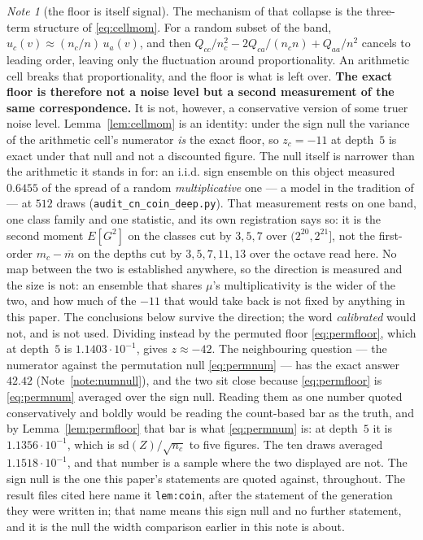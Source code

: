 \documentclass[11pt,a4paper]{article}
\theoremstyle{plain}
\theoremstyle{definition}
\theoremstyle{remark}
\newtheorem{note}[theorem]{Note}
\begin{document}
\begin{note}[the floor is itself signal]\label{note:floorsignal}
The mechanism of that collapse is the three-term structure of
\eqref{eq:cellmom}. For a random subset of the band,
$u_c(v)\approx(n_c/n)\,u_a(v)$, and then
$Q_{cc}/n_c^2-2Q_{ca}/(n_cn)+Q_{aa}/n^2$ cancels to leading order,
leaving only the fluctuation around proportionality. An arithmetic
cell breaks that proportionality, and the floor is what is left over.
\textbf{The exact floor is therefore not a noise level but a second
measurement of the same correspondence.} It is not, however, a
conservative version of some truer noise level. Lemma~\ref{lem:cellmom}
is an identity: under the sign null the variance of the arithmetic
cell's numerator \emph{is} the exact floor, so $z_c=-11$ at depth~$5$
is exact under that null and not a discounted figure. The null
itself is narrower than the arithmetic it stands in for: an
i.i.d. sign ensemble on this object measured $0.6455$ of the
spread of a random \emph{multiplicative} one --- a model in the
tradition of \cite{Wintner} --- at $512$ draws
(\texttt{audit\_cn\_coin\_deep.py}).
That measurement rests on one band, one class family and one
statistic, and its own registration says so: it is the second
moment $E[G^2]$ on the classes cut by $3,5,7$ over
$(2^{20},2^{21}]$, not the first-order $m_c-\overline m$ on the
depths cut by $3,5,7,11,13$ over the octave read here. No map
between the two is established anywhere, so the direction is
measured and the size is not: an ensemble that shares $\mu$'s
multiplicativity is the wider of the two, and how much of the
$-11$ that would take back is not fixed by anything in this
paper. The conclusions below survive the direction;
the word \emph{calibrated} would not, and is not used.
Dividing instead by
the permuted floor \eqref{eq:permfloor}, which at depth~$5$ is
$1.1403\cdot10^{-1}$, gives $z\approx-42$. The neighbouring question
--- the numerator against the permutation null \eqref{eq:permnum} ---
has the exact answer $42.42$ (Note~\ref{note:numnull}), and the two
sit close because \eqref{eq:permfloor} is \eqref{eq:permnum} averaged
over the sign null. Reading them as one number quoted conservatively
and boldly would be reading the count-based bar as the truth, and by
Lemma~\ref{lem:permfloor} that bar is what \eqref{eq:permnum} is: at
depth~$5$ it is $1.1356\cdot10^{-1}$, which is
$\mathrm{sd}(Z)/\sqrt{n_c}$ to five figures. The ten draws averaged
$1.1518\cdot10^{-1}$, and that number is a sample where the two
displayed are not. The sign null is the one this paper's statements
are quoted against, throughout. The result files cited here name
it \texttt{lem:coin}, after the statement of the generation they
were written in; that name means this sign null and no further
statement, and it is the null the width comparison earlier in this
note is about.
\end{note}
\end{document}
